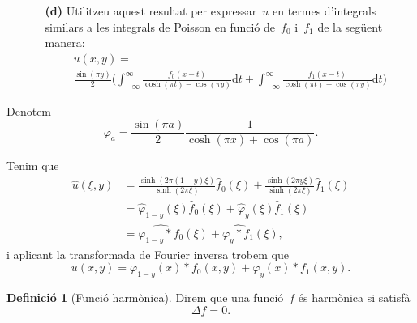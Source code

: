 \documentclass[a4paper]{article}
\theoremstyle{plain}
\theoremstyle{definition}
\newtheorem{definition}{Definició}
\providecommand{\uppi}{\pi}
\newcommand{\diff}{\mathrm{d}}
\begin{document}
\begin{enumerate}
    \item[]\begin{enumerate}
        \item[\textbf{(d)}] Utilitzeu aquest resultat per expressar~\(u\) en
            termes d'integrals similars a les integrals de Poisson en funció
            de~\(f_{0}\) i~\(f_{1}\) de la següent manera:
            \begin{multline*}
                u(x,y)
                = \\
                \frac{\sin(\uppi y)}{2}
                \biggl(
                    \int_{-\infty}^{\infty}
                    \frac{f_{0}(x-t)}{\cosh(\uppi t)-\cos(\uppi y)}
                    \diff t
                    +
                    \int_{-\infty}^{\infty}
                    \frac{f_{1}(x-t)}{\cosh(\uppi t)+\cos(\uppi y)}
                    \diff t
                \biggr)
            \end{multline*}
    \end{enumerate}
\end{enumerate}

Denotem
\[
    \varphi_{a}
    =
    \frac{\sin(\uppi a)}{2}
    \frac{1}{\cosh(\uppi x) + \cos(\uppi a)}.
\]

Tenim que
\begin{align*}
    \widehat{u}(\xi,y) &= \frac{\sinh(2\uppi(1-y)\xi)}{\sinh(2\uppi\xi)}
                          \widehat{f}_{0}(\xi)
                          +
                          \frac{\sinh(2\uppi y\xi)}{\sinh(2\uppi\xi)}
                          \widehat{f}_{1}(\xi) \\
                       &= \widehat{\varphi}_{1-y}(\xi)
                          \widehat{f}_{0}(\xi)
                          +
                          \widehat{\varphi}_{y}(\xi)
                          \widehat{f}_{1}(\xi) \\
                       &= \widehat{\varphi_{1-y}\ast f_{0}}(\xi)
                          +
                          \widehat{\varphi_{y}\ast f_{1}}(\xi),
\end{align*}
i aplicant la transformada de Fourier inversa trobem que
\[
    u(x,y)
    =
    \varphi_{1-y}(x)\ast f_{0}(x,y)
    +
    \varphi_{y}(x)\ast f_{1}(x,y).
\]

\begin{definition}[Funció harmònica]
    Direm que una funció~\(f\) és harmònica si satisfà
    \[
        \Delta f = 0.
    \]
\end{definition}
\end{document}
